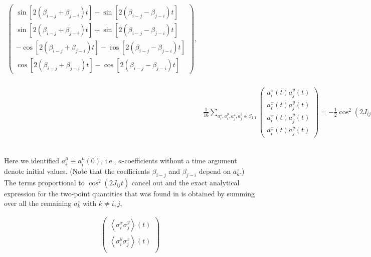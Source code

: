 \documentclass[aps,prl,showpacs,amsmath,amssymb,superscriptaddress,reprint,10pt]{revtex4-1}
\newcommand{\mk}[1]{{\color{michael} #1}}
\begin{document}
\begin{bibunit}
\begin{widetext}
\begin{subequations}
\begin{align}
\begin{pmatrix}
        \sin\left[2(\beta_{i-j}+\beta_{j-i})t\right]-\sin\left[2(\beta_{i-j}-\beta_{j-i})t\right]\\
        \sin\left[2(\beta_{i-j}+\beta_{j-i})t\right]+\sin\left[2(\beta_{i-j}-\beta_{j-i})t\right]\\
        -\cos\left[2(\beta_{i-j}+\beta_{j-i})t\right]-\cos\left[2(\beta_{i-j}-\beta_{j-i})t\right]\\
        \cos\left[2(\beta_{i-j}+\beta_{j-i})t\right]-\cos\left[2(\beta_{i-j}-\beta_{j-i})t\right]
       \end{pmatrix},\\
 &\frac{1}{16}\sum_{a_i^z,a_i^y,a_j^z,a_j^y\in S_{\text{1-1}}}
 \begin{pmatrix}
 a_i^x(t)a_j^y(t)\\
 a_i^x(t)a_j^y(t)\\
 a_i^x(t)a_j^y(t)\\
 a_i^x(t)a_j^y(t)
 \end{pmatrix}
=
 -\frac{1}{2}\cos^2(2J_{ij}t)\begin{pmatrix}
        \sin\left[2(\beta_{i-j}+\beta_{j-i})t\right]-\sin\left[2(\beta_{i-j}-\beta_{j-i})t\right]\\
        \sin\left[2(\beta_{i-j}+\beta_{j-i})t\right]+\sin\left[2(\beta_{i-j}-\beta_{j-i})t\right]\\
        -\cos\left[2(\beta_{i-j}+\beta_{j-i})t\right]-\cos\left[2(\beta_{i-j}-\beta_{j-i})t\right]\\
        \cos\left[2(\beta_{i-j}+\beta_{j-i})t\right]-\cos\left[2(\beta_{i-j}-\beta_{j-i})t\right]
       \end{pmatrix}.
\end{align}
\end{subequations}
\end{widetext}
Here we identified $a_i^\mu\equiv a_i^\mu(0)$, i.e., $a$-coefficients without a time argument denote initial values. (Note that the coefficients $\beta_{i-j}$ and $\beta_{j-i}$ depend on $a_k^z$.) The terms proportional to $\cos^2(2J_{ij}t)$ cancel out and the exact analytical expression for the two-point quantities \mk{that was found in}\cite{vdWorm_etal13} is obtained by summing over all the remaining $a_k^z$ with $k\neq i,j$,
\begin{widetext}
\begin{subequations}
\begin{align}
\begin{pmatrix}
        \left\langle\sigma_i^x\sigma_j^y\right\rangle(t)\\
        \left\langle\sigma_i^y\sigma_j^x\right\rangle(t)\\

\end{pmatrix}
\end{align}
\end{subequations}
\end{widetext}
\end{bibunit}
\end{document}
